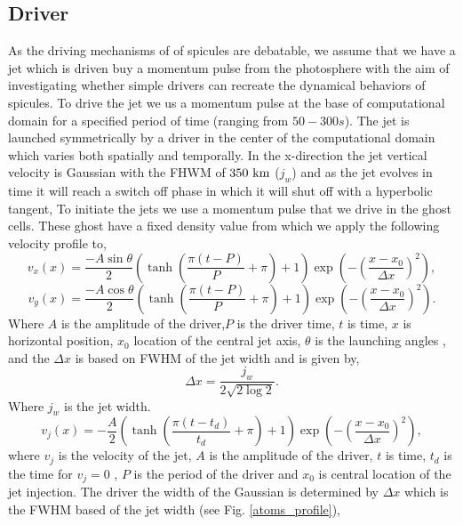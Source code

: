 \documentclass[12pt]{ociamthesis}
\newcommand{\fref}[1]{Fig. \eqref{#1}}
\begin{document}
\subsection{Driver}
\label{subsec:driver}
As the driving mechanisms of of spicules are debatable, we assume that we have a jet which is driven buy a momentum pulse from the photosphere with the aim of investigating whether simple drivers can recreate the dynamical behaviors of spicules.
To drive the jet we us a momentum pulse at the base of computational domain for a specified period of time (ranging from $50-300s$). The jet is launched symmetrically by a driver in the center of the computational domain which varies both spatially and temporally. In the x-direction the jet vertical velocity is Gaussian with the FHWM of $350 \ \rm{km}$ ($j_w$) and as the jet evolves in time it will reach a switch off phase in which it will shut off with a hyperbolic tangent,
To initiate the jets we use a momentum pulse that we drive in the ghost cells. These ghost have a fixed density value from which we apply the following velocity profile to,
\begin{equation}
    v_x(x) = \frac{-A\sin{\theta}}{2}\left( \tanh{\left( \frac{\pi (t-P)}{P}+ \pi \right) +1 } \right) \exp \left( - \left(\frac{x-x_0}{\Delta x} \right)^2  \right),
\end{equation}
\begin{equation}
    v_y(x) = \frac{-A\cos{\theta}}{2}\left( \tanh{\left( \frac{\pi (t-P)}{P}+ \pi \right) +1 } \right) \exp \left( - \left(\frac{x-x_0}{\Delta x} \right)^2  \right).
\end{equation}
Where $A$ is the amplitude of the driver,$P$ is the driver time, $t$ is time, $x$ is horizontal position, $x_0$ location of the central jet axis, $\theta$ is the launching angles , and the $\Delta x$ is based on FWHM of the jet width and is given by, 
\begin{equation}
\Delta x = \dfrac{j_w}{2 \sqrt{2 \log{2}}}.
\end{equation}
Where $j_w$ is the jet width.
\begin{equation}
v_{j}(x) = -\frac{A}{2} \left( \tanh \left( \frac{\pi (t-t_{d})}{t_d}+ \pi \right) +1 \right) \exp \left( - \left(\frac{x-x_0}{\Delta x} \right)^2  \right),
\end{equation}    
where $v_j$ is the velocity of the jet, $A$ is the amplitude of the driver, $t$ is time, $t_{d}$ is the time for $v_j=0$ , $P$ is the period of the driver and $x_0$ is central location of the jet injection. The driver the width of the Gaussian is determined by $\Delta x$ which is the FWHM based of the jet width (see \fref{atoms_profile}),
\end{document}
